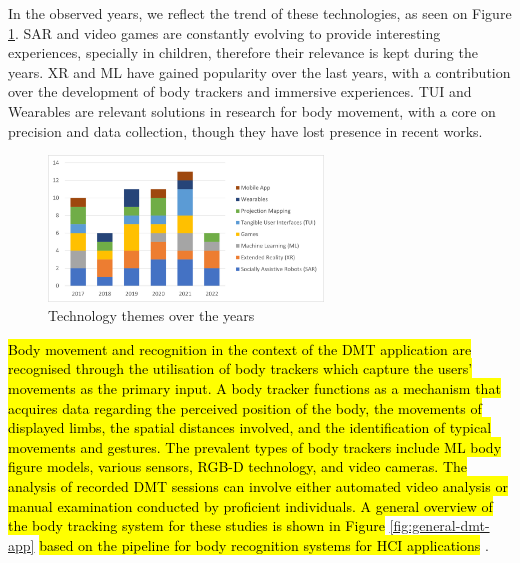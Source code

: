 \documentclass[a4paper,fleqn]{cas-sc}
\begin{document}
In the observed years, we reflect the trend of these technologies, as seen on Figure \ref{fig:tech-themes-years}. SAR and video games are constantly evolving to provide interesting experiences, specially in children, therefore their relevance is kept during the years. XR and ML have gained popularity over the last years, with a contribution over the development of body trackers and immersive experiences. TUI and Wearables are relevant solutions in research for body movement, with a core on precision and data collection, though they have lost presence in recent works.

\begin{figure}
	\includegraphics[width=0.65\textwidth]{fig7_tech-themes-years.png}
        \centering
	  \caption{Technology themes over the years}\label{fig:tech-themes-years}
\end{figure}


\hl{Body movement and recognition in the context of the DMT application are recognised through the utilisation of body trackers which capture the users' movements as the primary input. A body tracker functions as a mechanism that acquires data regarding the perceived position of the body, the movements of displayed limbs, the spatial distances involved, and the identification of typical movements and gestures. The prevalent types of body trackers include ML body figure models, various sensors, RGB-D technology, and video cameras. The analysis of recorded DMT sessions can involve either automated video analysis or manual examination conducted by proficient individuals. A general overview of the body tracking system for these studies is shown in Figure} \ref{fig:general-dmt-app} \hl{based on the pipeline for body recognition systems for HCI applications} \cite{Ahmed21}.
\end{document}

